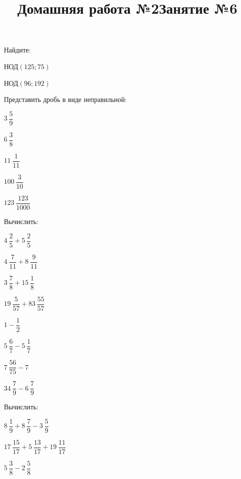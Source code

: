\newpage
\title{Домашняя работа №2}
\begin{listofex}
	\item Найдите:
	\begin{enumcols}[itemcolumns=5]
		\item НОД\( (125; 75) \)
		\item НОД\( (96; 192) \)
	\end{enumcols}
	
\end{listofex}
%
\newpage
\title{Занятие №6}
\begin{listofex}
	\item Представить дробь в виде неправильной:
	\begin{enumcols}[itemcolumns=5]
		\item \( 3\:\dfrac{5}{9} \)
		\item \( 6\:\dfrac{3}{8} \)
		\item \( 11\:\dfrac{1}{11} \)
		\item \( 100\:\dfrac{3}{10} \)
		\item \( 123\:\dfrac{123}{1000} \)
	\end{enumcols}
	\item Вычислить:
	\begin{enumcols}[itemcolumns=4]
		\item \( 4\:\dfrac{2}{5}+5\:\dfrac{2}{5} \)
		\item \( 4\:\dfrac{7}{11}+8\:\dfrac{9}{11} \)
		\item \( 3\:\dfrac{7}{8}+15\:\dfrac{1}{8} \)
		\item \( 19\:\dfrac{5}{57}+83\:\dfrac{55}{57} \)
		\item \( 1-\dfrac{1}{2} \)
		\item \( 5\:\dfrac{6}{7}-5\:\dfrac{1}{7} \)
		\item \( 7\:\dfrac{56}{75}-7 \)
		\item \( 34\:\dfrac{7}{9}-6\:\dfrac{7}{9} \)
	\end{enumcols}
	\item Вычислить:
	\begin{enumcols}[itemcolumns=3]
		\item \( 8\:\dfrac{1}{9}+8\:\dfrac{7}{9}-3\:\dfrac{5}{9} \)
		\item \( 17\:\dfrac{15}{17}+5\:\dfrac{13}{17}+19\:\dfrac{11}{17} \)
		\item \( 5\:\dfrac{3}{8}-2\:\dfrac{5}{8} \)

\end{enumcols}
\end{listofex}
